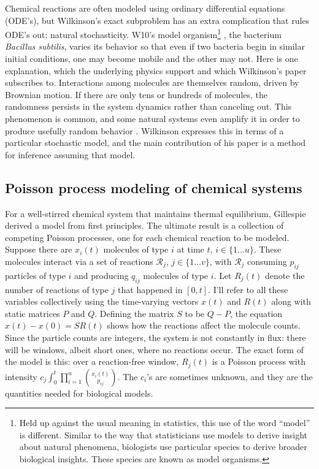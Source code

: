 \documentclass{article}
\begin{document}
Chemical reactions are often modeled using ordinary differential equations (ODE's), but Wilkinson's exact subproblem has an extra complication that rules ODE's out: natural stochasticity. W10's model organism\footnote{Held up against the usual meaning in statistics, this use of the word ``model'' is different. Similar to the way that statisticians use models to derive insight about natural phenomena, biologists use particular species to derive broader biological insights. These species are known as model organisms.}
, the bacterium {\it Bacillus subtilis}, varies its behavior so that even if two bacteria begin in similar initial conditions, one may become mobile and the other may not. Here is one explanation, which the underlying physics support and which  Wilkinson's paper subscribes to. Interactions among molecules are themselves random, driven by Brownian motion. If there are only tens or hundreds of molecules, the randomness persists in the system dynamics rather than canceling out. This phenomenon is common, and some natural systems even amplify it in order to produce usefully random behavior \cite{reinker2006parameter}. Wilkinson expresses this in terms of a particular stochastic model, and the main contribution of his paper is a method for inference assuming that model.
 

\subsection{Poisson process modeling of chemical systems}

For a well-stirred chemical system that maintains thermal equilibrium, Gillespie  \cite{gillespie1992rigorous} derived a model from first principles. The ultimate result is a collection of competing Poisson processes, one for each chemical reaction to be modeled. Suppose there are $x_{i}(t)$ molecules of type $i$ at time $t$, $i\in \{1 ... u\}$. These molecules interact via a set of reactions $\mathcal{R}_{j}$, $j\in \{1 ... v\}$, with $\mathcal{R}_{j}$ consuming $p_{ij}$ particles of type $i$ and producing $q_{ij}$ molecules of type $i$. Let $R_{j}(t)$ denote the number of reactions of type $j$ that happened in $[0,t]$. I'll refer to all these variables collectively using the time-varying vectors $x(t)$ and $R(t)$ along with static matrices $P$ and $Q$. Defining the matrix $S$ to be $Q-P$, the equation $x(t) - x(0) = SR(t)$ shows how the reactions affect the molecule counts. Since the particle counts are integers, the system is not constantly in flux: there will be windows, albeit short ones, where no reactions occur. The exact form of the model is this: over a reaction-free window, $R_{j}(t)$ is a Poisson process with intensity $c_{j}\int_0^t \prod_{i=1}^u {{x_i(t)}\choose{p_{ij}}}$. %
The $c_{i}$'s are sometimes unknown, and they are the quantities needed for biological models.
\end{document}
